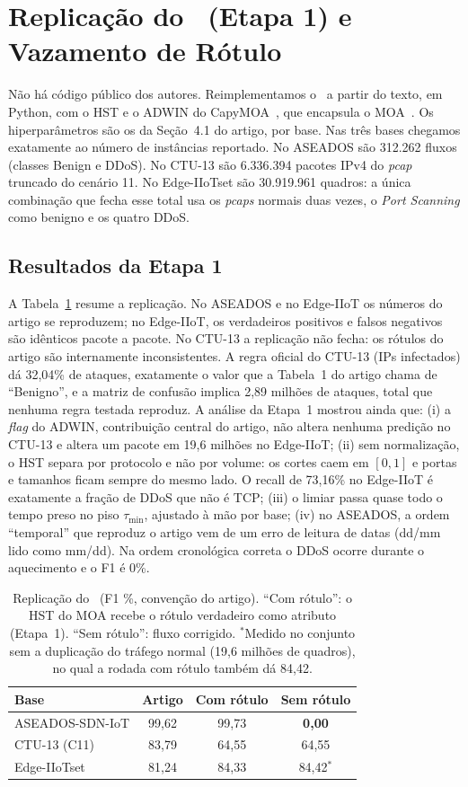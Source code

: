 \section{Replicação do \modus\ (Etapa 1) e Vazamento de Rótulo}
\label{sec:replication}

Não há código público dos autores. Reimplementamos o \modus\ a partir do texto, em Python, com o
HST e o ADWIN do CapyMOA~\cite{gomes2025capymoa}, que encapsula o MOA~\cite{bifet2010moa}. Os
hiperparâmetros são os da Seção~4.1 do artigo, por base. Nas três bases chegamos exatamente ao
número de instâncias reportado. No ASEADOS são 312.262 fluxos (classes Benign e DDoS). No CTU-13
são 6.336.394 pacotes IPv4 do \emph{pcap} truncado do cenário 11. No Edge-IIoTset são 30.919.961
quadros: a única combinação que fecha esse total usa os \emph{pcaps} normais duas vezes, o
\emph{Port Scanning} como benigno e os quatro DDoS.

\subsection{Resultados da Etapa 1}
A Tabela~\ref{tab:repl} resume a replicação. No ASEADOS e no Edge-IIoT os números do artigo se
reproduzem; no Edge-IIoT, os verdadeiros positivos e falsos negativos são idênticos pacote a pacote.
No CTU-13 a replicação não fecha: os rótulos do artigo são internamente inconsistentes. A regra
oficial do CTU-13 (IPs infectados) dá 32,04\% de ataques, exatamente o valor que a Tabela~1 do
artigo chama de ``Benigno'', e a matriz de confusão implica 2,89 milhões de ataques, total que
nenhuma regra testada reproduz. A análise da Etapa~1 mostrou ainda que:
(i) a \emph{flag} do ADWIN, contribuição central do artigo, não altera nenhuma predição no CTU-13 e
altera um pacote em 19,6 milhões no Edge-IIoT;
(ii) sem normalização, o HST separa por protocolo e não por volume: os cortes caem em $[0,1]$ e
portas e tamanhos ficam sempre do mesmo lado. O recall de 73,16\% no Edge-IIoT é exatamente a
fração de DDoS que não é TCP;
(iii) o limiar passa quase todo o tempo preso no piso $\tau_{\min}$, ajustado à mão por base;
(iv) no ASEADOS, a ordem ``temporal'' que reproduz o artigo vem de um erro de leitura de datas
(dd/mm lido como mm/dd). Na ordem cronológica correta o DDoS ocorre durante o aquecimento e o F1 é 0\%.

\begin{table}[t]
\centering
\caption{Replicação do \modus\ (F1 \%, convenção do artigo). ``Com rótulo'': o HST do MOA recebe o
rótulo verdadeiro como atributo (Etapa~1). ``Sem rótulo'': fluxo corrigido. $^{*}$Medido no conjunto
sem a duplicação do tráfego normal (19,6 milhões de quadros), no qual a rodada com rótulo também dá 84,42.}
\label{tab:repl}
\begin{tabular}{lccc}
\toprule
Base & Artigo & Com rótulo & Sem rótulo \\
\midrule
ASEADOS-SDN-IoT & 99,62 & 99,73 & \textbf{0,00} \\
CTU-13 (C11)    & 83,79 & 64,55 & 64,55 \\
Edge-IIoTset    & 81,24 & 84,33 & 84,42$^{*}$ \\
\bottomrule
\end{tabular}
\end{table}

